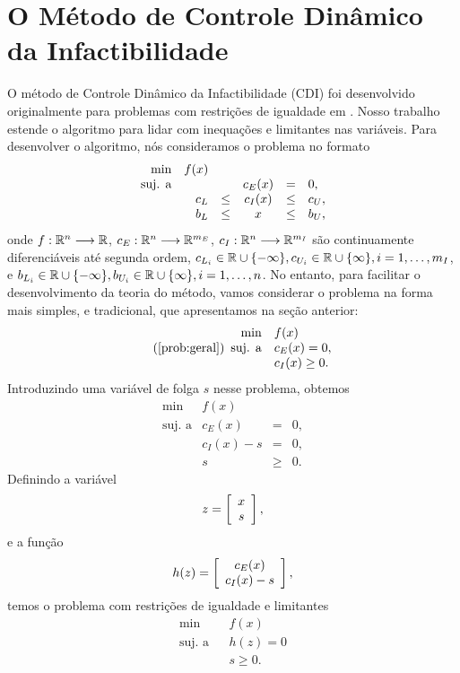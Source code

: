 \chapter{O Método de Controle Dinâmico da Infactibilidade}

O método de Controle Dinâmico da Infactibilidade (CDI) foi desenvolvido originalmente 
para problemas com restrições de igualdade em \cite{bib:chico-dci}. Nosso trabalho estende o algoritmo 
para lidar com inequações e limitantes nas variáveis.
Para desenvolver o algoritmo, nós consideramos o problema no formato
\begin{equation}\visiblelbl{prob:geral_cuter}
\begin{array}{rrrcll}
 \min & f(x) \\
 \mbox{suj. a} & & & c_E(x) & = & 0, \\
& c_L & \leq & c_I(x) & \leq & c_U, \\
& b_L & \leq &     x  & \leq & b_U,
\end{array}
\end{equation}
onde $f:\mathbb{R}^{n}\longrightarrow\mathbb{R}$, $c_E:\mathbb{R}^{n}\longrightarrow\mathbb{R}^{m_E}$, $c_I:\mathbb{R}^{n}\longrightarrow\mathbb{R}^{m_I}$ são continuamente
diferenciáveis até segunda ordem, 
$c_{L_i} \in \mathbb{R}\cup\{-\infty\}, c_{U_i} \in \mathbb{R}\cup\{\infty\}, i = 1,\dots,m_I$, e
$b_{L_i} \in \mathbb{R}\cup\{-\infty\}, b_{U_i} \in \mathbb{R}\cup\{\infty\}, i = 1,\dots,n$.
No entanto, para facilitar o desenvolvimento da teoria do método, 
vamos considerar o problema na forma mais simples, e tradicional, que
apresentamos na seção anterior:
\begin{equation}\tag{\ref{prob:geral}}
 \begin{array}{rl}
  \min & f(x) \\
   \mbox{suj. a} & c_E(x) =  0, \\
               & c_I(x) \geq 0.
 \end{array}
\end{equation}
Introduzindo uma variável de folga $s$ nesse problema, obtemos
\begin{equation}
\begin{array}{rrcl}
 \min & f(x) \\
 \mbox{suj. a} & c_E(x) & = & 0, \\
               & c_I(x) - s & = & 0, \\
               & s & \geq & 0.
\end{array}
\end{equation}
Definindo a vari\'avel
\begin{eqnarray*}
 z = \left[\begin{array}{c}x \\ s\end{array}\right],
\end{eqnarray*}
e a fun\c{c}\~ao
\begin{equation}\visiblelbl{def:h}
h(z) = \vetor{c_E(x)}{c_I(x) - s}, 
\end{equation}
temos o problema com restrições de igualdade e limitantes
\begin{eqnarray*}
  \min & & f(x) \\
  \mbox{suj. a} & & h(z) = 0 \\
       & & s \geq 0.
\end{eqnarray*}

